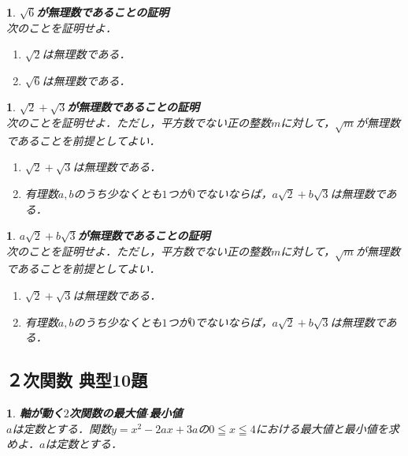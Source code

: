 \documentclass[10pt,
fleqn,
dvipdfmx,
uplatex
]{jsarticle}
\newtheorem{question}[Question]{}
\begin{document}
\begin{question}{\bf\boldmath $\sqrt 6$が無理数であることの証明}\\
次のことを証明せよ．
\begin{enumerate}
\item $\sqrt 2$は無理数である．
\item $\sqrt 6$は無理数である．
\end{enumerate}

\end{question}



\begin{question}{\bf\boldmath $\sqrt 2+\sqrt 3$が無理数であることの証明}\\
次のことを証明せよ．ただし，平方数でない正の整数$m$に対して，$\sqrt m$が無理数であることを前提としてよい．
\begin{enumerate}
\item $\sqrt 2+\sqrt 3$は無理数である．
\item 有理数$a, b$のうち少なくとも$1$つが$0$でないならば，$a\sqrt 2+b\sqrt 3$は無理数である．
\end{enumerate}

\end{question}



\begin{question}{\bf\boldmath $a\sqrt 2+b\sqrt 3$が無理数であることの証明}\\
次のことを証明せよ．ただし，平方数でない正の整数$m$に対して，$\sqrt m$が無理数であることを前提としてよい．
\begin{enumerate}
\item $\sqrt 2+\sqrt 3$は無理数である．
\item 有理数$a, b$のうち少なくとも$1$つが$0$でないならば，$a\sqrt 2+b\sqrt 3$は無理数である．
\end{enumerate}

\end{question}

\subsection{２次関数 典型10題}



\begin{question}{\bf\boldmath 軸が動く$2$次関数の最大値$\cdot$最小値}\\
$a$は定数とする．関数$y=x^2-2ax+3a$の$0\leqq x\leqq 4$における最大値と最小値を求めよ．$a$は定数とする．
\end{question}
\end{document}
